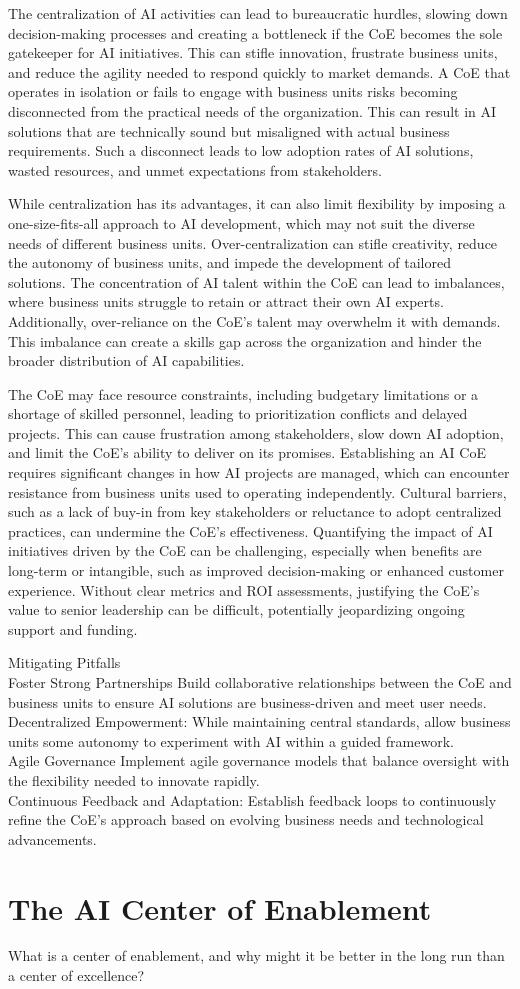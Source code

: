 The centralization of AI activities can lead to bureaucratic hurdles,
slowing down decision-making processes and creating a bottleneck if the
CoE becomes the sole gatekeeper for AI initiatives. This can stifle
innovation, frustrate business units, and reduce the agility needed to
respond quickly to market demands. A CoE that operates in isolation or
fails to engage with business units risks becoming disconnected from the
practical needs of the organization. This can result in AI solutions
that are technically sound but misaligned with actual business
requirements. Such a disconnect leads to low adoption rates of AI
solutions, wasted resources, and unmet expectations from stakeholders.

While centralization has its advantages, it can also limit flexibility
by imposing a one-size-fits-all approach to AI development, which may
not suit the diverse needs of different business units.
Over-centralization can stifle creativity, reduce the autonomy of
business units, and impede the development of tailored solutions. The
concentration of AI talent within the CoE can lead to imbalances, where
business units struggle to retain or attract their own AI experts.
Additionally, over-reliance on the CoE's talent may overwhelm it with
demands. This imbalance can create a skills gap across the organization
and hinder the broader distribution of AI capabilities.

The CoE may face resource constraints, including budgetary limitations
or a shortage of skilled personnel, leading to prioritization conflicts
and delayed projects. This can cause frustration among stakeholders,
slow down AI adoption, and limit the CoE's ability to deliver on its
promises. Establishing an AI CoE requires significant changes in how AI
projects are managed, which can encounter resistance from business units
used to operating independently. Cultural barriers, such as a lack of
buy-in from key stakeholders or reluctance to adopt centralized
practices, can undermine the CoE's effectiveness. Quantifying the impact
of AI initiatives driven by the CoE can be challenging, especially when
benefits are long-term or intangible, such as improved decision-making
or enhanced customer experience. Without clear metrics and ROI
assessments, justifying the CoE's value to senior leadership can be
difficult, potentially jeopardizing ongoing support and funding.

Mitigating Pitfalls\\
Foster Strong Partnerships Build collaborative relationships between the
CoE and business units to ensure AI solutions are business-driven and
meet user needs.\\
Decentralized Empowerment: While maintaining central standards, allow
business units some autonomy to experiment with AI within a guided
framework.\\
Agile Governance Implement agile governance models that balance
oversight with the flexibility needed to innovate rapidly.\\
Continuous Feedback and Adaptation: Establish feedback loops to
continuously refine the CoE's approach based on evolving business needs
and technological advancements.

\section{The AI Center of Enablement}\label{the-ai-center-of-enablement}

What is a center of enablement, and why might it be better in the long
run than a center of excellence?
